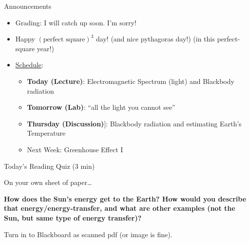 \documentclass[12pt]{beamer}
\title%
{}
\subtitle
{} %
\author%
{Ben Holder}%
\date%
{}
\begin{document}

\begin{frame}{Announcements}
	\begin{itemize}
	\addtolength{\itemsep}{0.5\baselineskip}
	\item Grading: I will catch up soon. I'm sorry!
	\item Happy $(\text{perfect square})^3$ day! (and nice pythagoras day!)  (in this perfect-square year!)
	\item \underline{Schedule}:
		\begin{itemize}
		\item[]{\bf Today (Lecture)}: Electromagnetic Spectrum (light) and Blackbody radiation
		\item[]{\bf Tomorrow (Lab)}: ``all the light you cannot see''
		\item[]{\bf Thursday (Discussion)}]: Blackbody radiation and estimating Earth's Temperature
		\item Next Week: Greenhouse Effect I
		\end{itemize}
	\end{itemize}

\end{frame}
\begin{frame}{Today's Reading Quiz (3 min)}


	
\vspace{1cm}

On your own sheet of paper\ldots

\vspace{0.5cm}

{\bf How does the Sun's energy get to the Earth?  How would you describe that energy/energy-transfer, and what are other examples (not the Sun, but same type of energy transfer)?}

\vspace{0.5cm}

Turn in to Blackboard as scanned pdf (or image is fine).

\end{frame}
\end{document}
